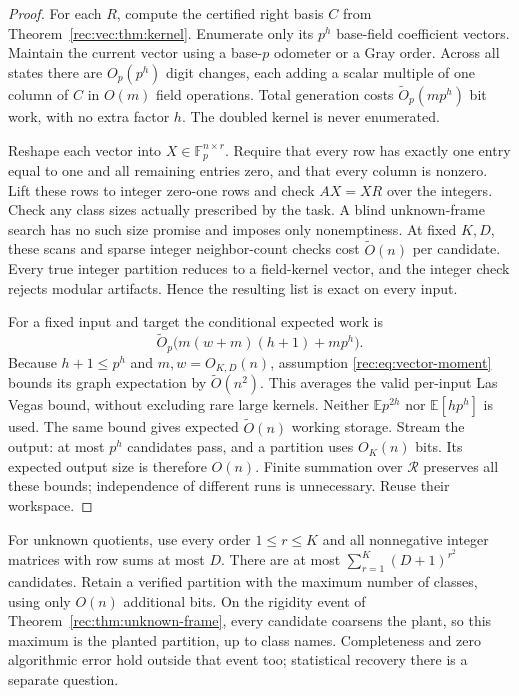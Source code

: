 \documentclass[11pt]{article}
\theoremstyle{definition}
\theoremstyle{remark}
\newcommand{\E}{\mathbb E}
\newcommand{\1}{\mathbf 1}
\providecommand{\Fp}{\mathbb F_p}
\begin{document}
\begin{proof}
For each $R$, compute the certified right basis $C$ from
Theorem~\ref{rec:vec:thm:kernel}. Enumerate only its $p^h$ base-field
coefficient vectors. Maintain the current vector using a base-$p$
odometer or a Gray order. Across all states there are $O_p(p^h)$
digit changes, each adding a scalar multiple of one column of $C$
in $O(m)$ field operations. Total generation costs
$\widetilde O_p(mp^h)$ bit work, with no extra factor $h$.
The doubled kernel is never enumerated.

Reshape each vector into $X\in\Fp^{n\times r}$. Require that every
row has exactly one entry equal to one and all remaining entries
zero, and that every column is nonzero. Lift these rows to integer
zero-one rows and check $AX=XR$ over the integers. Check any class
sizes actually prescribed by the task. A blind unknown-frame search
has no such size promise and imposes only nonemptiness. At fixed
$K,D$, these scans and sparse integer neighbor-count checks cost
$\widetilde O(n)$ per candidate. Every true integer partition reduces
to a field-kernel vector, and the integer check rejects modular
artifacts. Hence the resulting list is exact on every input.

For a fixed input and target the conditional expected work is
\begin{equation}\label{rec:eq:vector-per-input}
 \widetilde O_p\bigl(m(w+m)(h+1)+mp^h\bigr).
\end{equation}
Because $h+1\le p^h$ and $m,w=O_{K,D}(n)$, assumption
\eqref{rec:eq:vector-moment} bounds its graph expectation by
$\widetilde O(n^2)$. This averages the valid per-input Las Vegas
bound, without excluding rare large kernels. Neither
$\E p^{2h}$ nor $\E[h p^h]$ is used.
The same bound gives expected $\widetilde O(n)$ working storage.
Stream the output: at most $p^h$ candidates pass, and a partition
uses $O_K(n)$ bits. Its expected output size is therefore $O(n)$.
Finite summation over $\mathcal R$ preserves all these bounds;
independence of different runs is unnecessary. Reuse their workspace.
\end{proof}

For unknown quotients, use every order $1\le r\le K$ and all
nonnegative integer matrices with row sums at most $D$. There are
at most $\sum_{r=1}^K(D+1)^{r^2}$ candidates. Retain a verified
partition with the maximum number of classes, using only $O(n)$
additional bits. On the rigidity event of
Theorem~\ref{rec:thm:unknown-frame}, every candidate coarsens the plant,
so this maximum is the planted partition, up to class names.
Completeness and zero algorithmic error hold outside that event too;
statistical recovery there is a separate question.
\end{document}
